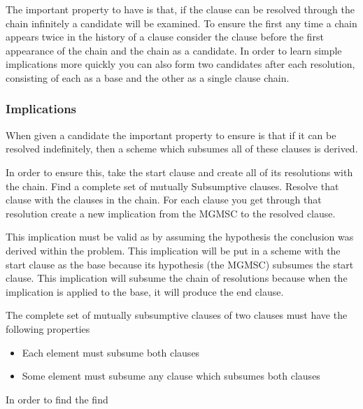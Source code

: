 \documentclass{article}
\begin{document}
The important property to have is that,
if the clause can be resolved through the chain infinitely a candidate will be examined.
To ensure the first any time a chain appears twice in the history of a clause
consider the clause before the first appearance of the chain and the chain as a candidate.
In order to learn simple implications more quickly you can also form two candidates after each resolution,
consisting of each as a base and the other as a single clause chain.

\subsubsection{Implications}

When given a candidate the important property to ensure is that if it can be resolved indefinitely,
then a scheme which subsumes all of these clauses is derived.

In order to ensure this, take the start clause and create all of its resolutions with the chain.
Find a complete set of mutually Subsumptive clauses.
Resolve that clause with the clauses in the chain.
For each clause you get through that resolution create a new implication from the MGMSC to the resolved clause.

This implication must be valid as by assuming the hypothesis the conclusion was derived within the problem.
This implication will be put in a scheme with the start clause as the base because its hypothesis (the MGMSC) subsumes the start clause.
This implication will subsume the chain of resolutions because when the implication is applied to the base,
  it will produce the end clause.

The complete set of mutually subsumptive clauses of two clauses must have the following properties
\begin{itemize}
  \item Each element must subsume both clauses
  \item Some element must subsume any clause which subsumes both clauses
\end{itemize}

In order to find the  find
\end{document}
